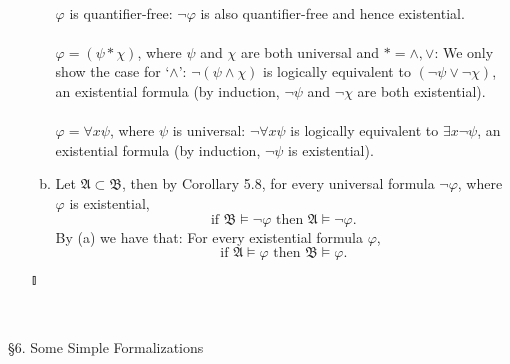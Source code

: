 \begin{enumerate}[1.]
\begin{enumerate}[(a)]
\ 
\\$\varphi$ is quantifier-free: $\neg \varphi$ is also quantifier-free and hence existential.\\
\ 
\\$\varphi = (\psi \ast \chi)$, where $\psi$ and $\chi$ are both universal and $\ast = \land, \lor$: We only show the case for `$\land$': $\neg ( \psi \land \chi )$ is logically equivalent to $(\neg \psi \lor \neg \chi)$, an existential formula (by induction, $\neg \psi$ and $\neg \chi$ are both existential).\\
\ 
\\$\varphi = \forall x \psi$, where $\psi$ is universal: $\neg \forall x \psi$ is logically equivalent to $\exists x \neg \psi$, an existential formula (by induction, $\neg \psi$ is existential).
\item Let $\mathfrak{A} \subset \mathfrak{B}$, then by Corollary 5.8, for every universal formula $\neg \varphi$, where $\varphi$ is existential,
\[
\mbox{if $\mathfrak{B} \models \neg \varphi$ then $\mathfrak{A} \models \neg \varphi$.}
\]
By (a) we have that: For every existential formula $\varphi$,
\[
\mbox{if $\mathfrak{A} \models \varphi$ then $\mathfrak{B} \models \varphi$}.
\]
\end{enumerate} \begin{flushright}$\talloblong$\end{flushright}
\end{enumerate}
\ 
\\
\\
{\large \S6. Some Simple Formalizations}
